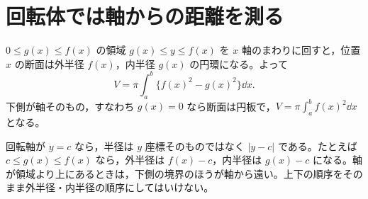 \section{回転体では軸からの距離を測る}\label{節:回転体の体積}

$0\leq g(x)\leq f(x)$ の領域 $g(x)\leq y\leq f(x)$ を $x$ 軸のまわりに回すと，位置 $x$ の断面は外半径 $f(x)$，内半径 $g(x)$ の円環になる。よって
\begin{equation}\label{式:円環断面の体積}
V=\pi\int_a^b\{f(x)^2-g(x)^2\}\dd x.
\end{equation}
下側が軸そのもの，すなわち $g(x)=0$ なら断面は円板で，$V=\pi\int_a^b f(x)^2\dd x$ となる。

回転軸が $y=c$ なら，半径は $y$ 座標そのものではなく $|y-c|$ である。たとえば $c\leq g(x)\leq f(x)$ なら，外半径は $f(x)-c$，内半径は $g(x)-c$ になる。軸が領域より上にあるときは，下側の境界のほうが軸から遠い。上下の順序をそのまま外半径・内半径の順序にしてはいけない。

%
%
